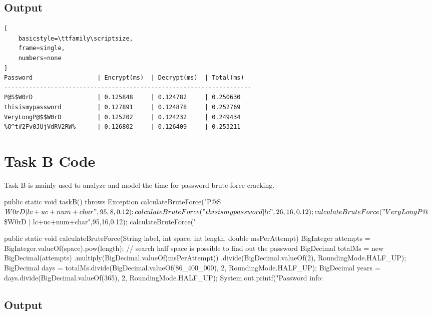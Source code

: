 \documentclass[12pt,a4paper]{article}
\begin{document}
\subsection{Output}
\begin{lstlisting}[
    basicstyle=\ttfamily\scriptsize, 
    frame=single,
    numbers=none
]
Password                  | Encrypt(ms)  | Decrypt(ms)  | Total(ms)   
---------------------------------------------------------------------
P@S$W0rD                  | 0.125848     | 0.124782     | 0.250630    
thisismypassword          | 0.127891     | 0.124878     | 0.252769    
VeryLongP@$$W0rD          | 0.125202     | 0.124232     | 0.249434    
%O^t#2Fv0JUjVdRV2RW%      | 0.126802     | 0.126409     | 0.253211
\end{lstlisting}


\section{Task B Code}

Task B is mainly used to analyze and model the time for password brute-force cracking.

\begin{mycode}
public static void taskB() throws Exception{
    calculateBruteForce("P@S$W0rD             | lc+uc+num+char",95,8,0.12);
    calculateBruteForce("thisismypassword     | lc            ",26,16,0.12);
    calculateBruteForce("VeryLongP@$\$W0rD     | lc+uc+num+char",95,16,0.12);
    calculateBruteForce("%
}

public static void calculateBruteForce(String label, int space, int length, double msPerAttempt) {
    BigInteger attempts = BigInteger.valueOf(space).pow(length);
    // search half space is possible to find out the password
    BigDecimal totalMs = new BigDecimal(attempts)
            .multiply(BigDecimal.valueOf(msPerAttempt))
            .divide(BigDecimal.valueOf(2), RoundingMode.HALF_UP);
    BigDecimal days = totalMs.divide(BigDecimal.valueOf(86_400_000), 2, RoundingMode.HALF_UP);
    BigDecimal years = days.divide(BigDecimal.valueOf(365), 2, RoundingMode.HALF_UP);
    System.out.printf("Password info: %
}
\end{mycode}

\subsection{Output}
\end{document}
